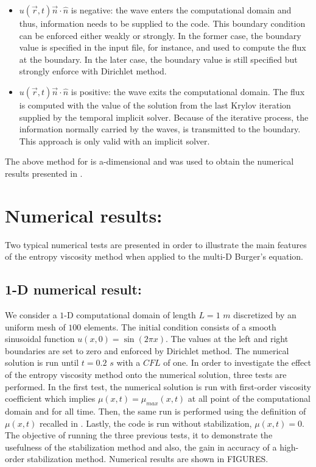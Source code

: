 \begin{itemize}
\item $u(\vec{r},t) \vec{n} \cdot \hat{n} $ is negative: the wave enters the computational domain and thus, information needs to be supplied to the code. This boundary condition can be enforced either weakly or strongly. In the former case, the boundary value is specified in the input file, for instance, and used to compute the flux at the boundary. In the later case, the boundary value is still specified but strongly enforce with Dirichlet method.
\item $u(\vec{r},t) \vec{n} \cdot \hat{n} $ is positive: the wave exits the computational domain. The flux is computed with the value of the solution from the last Krylov iteration supplied by the temporal implicit solver. Because of the iterative process, the information normally carried by the waves, is transmitted to the boundary. This approach is only valid with an implicit solver.
\end{itemize}
The above method for is a-dimensional and was used to obtain the numerical results presented in .
\section{Numerical results:}\label{sec:num_sct2b}
Two typical numerical tests are presented in order to illustrate the main features of the entropy viscosity method when applied to the multi-D Burger's equation.
%
\subsection{1-D numerical result:}\label{sec:1dnum_sct2b}
We consider a $1$-D computational domain of length $L=1$ $m$ discretized by an uniform mesh of $100$ elements. The initial condition consists of a smooth sinusoidal function $u(x,0) = \sin \left( 2 \pi x \right)$. The values at the left and right boundaries are set to zero and enforced by Dirichlet method. The numerical solution is run until $t=0.2$ $s$ with a $CFL$ of one. In order to investigate the effect of the entropy viscosity method onto the numerical solution, three tests are performed. In the first test, the numerical solution is run with first-order viscosity coefficient which implies $\mu(x,t) = \mu_{max}(x,t)$ at all point of the computational domain and for all time. Then, the same run is performed using the definition of $\mu(x,t)$ recalled in . Lastly, the code is run without stabilization, $\mu(x,t) = 0$. The objective of running the three previous tests, it to demonstrate the usefulness of the stabilization method and also, the gain in accuracy of a high-order stabilization method. Numerical results are shown in FIGURES.
%
